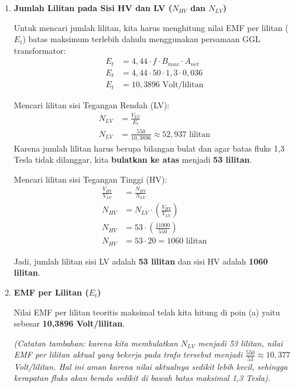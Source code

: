 \documentclass[12pt, a4paper]{article}
\begin{document}
\begin{enumerate}[label=\alph*.]
    \item \textbf{Jumlah Lilitan pada Sisi HV dan LV ($N_{HV}$ dan $N_{LV}$)}

    Untuk mencari jumlah lilitan, kita harus menghitung nilai EMF per lilitan ($E_t$) batas maksimum terlebih dahulu menggunakan persamaan GGL transformator:
    \begin{align*}
        E_t &= 4,44 \cdot f \cdot B_{max} \cdot A_{net} \\
        E_t &= 4,44 \cdot 50 \cdot 1,3 \cdot 0,036 \\
        E_t &= 10,3896 \text{ Volt/lilitan}
    \end{align*}

    Mencari lilitan sisi Tegangan Rendah (LV):
    \begin{align*}
        N_{LV} &= \frac{V_{LV}}{E_t} \\
        N_{LV} &= \frac{550}{10,3896} \approx 52,937 \text{ lilitan}
    \end{align*}
    Karena jumlah lilitan harus berupa bilangan bulat dan agar batas fluks 1,3 Tesla tidak dilanggar, kita \textbf{bulatkan ke atas} menjadi \textbf{53 lilitan}.

    Mencari lilitan sisi Tegangan Tinggi (HV):
    \begin{align*}
        \frac{V_{HV}}{V_{LV}} &= \frac{N_{HV}}{N_{LV}} \\
        N_{HV} &= N_{LV} \cdot \left(\frac{V_{HV}}{V_{LV}}\right) \\
        N_{HV} &= 53 \cdot \left(\frac{11000}{550}\right) \\
        N_{HV} &= 53 \cdot 20 = 1060 \text{ lilitan}
    \end{align*}

    Jadi, jumlah lilitan sisi LV adalah \textbf{53 lilitan} dan sisi HV adalah \textbf{1060 lilitan}.

    \item \textbf{EMF per Lilitan ($E_t$)}

    Nilai EMF per lilitan teoritis maksimal telah kita hitung di poin (a) yaitu sebesar \textbf{10,3896 Volt/lilitan}.

    \textit{(Catatan tambahan: karena kita membulatkan $N_{LV}$ menjadi 53 lilitan, nilai EMF per lilitan aktual yang bekerja pada trafo tersebut menjadi $\frac{550}{53} \approx 10,377$ Volt/lilitan. Hal ini aman karena nilai aktualnya sedikit lebih kecil, sehingga kerapatan fluks akan berada sedikit di bawah batas maksimal 1,3 Tesla).}


\end{enumerate}
\end{document}
